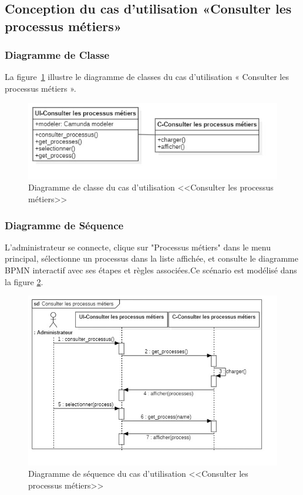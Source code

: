 \subsection{Conception du cas d’utilisation «Consulter les processus métiers»}
\subsubsection{Diagramme de Classe}
La figure~\ref{fig:c_cpmet} illustre le diagramme de classes du cas d'utilisation « Consulter les processus métiers ».
\begin{figure}[h]
     \centering
     \includegraphics[width=14cm]{images/c_cpmet.jpg}
     \caption{Diagramme de classe du cas d'utilisation <<Consulter les processus métiers>>}
     \label{fig:c_cpmet}
\end{figure}
\subsubsection{Diagramme de Séquence}
L'administrateur se connecte, clique sur "Processus métiers" dans le menu principal, sélectionne un processus dans la liste affichée, et consulte le diagramme BPMN interactif avec ses étapes et règles associées.Ce scénario est modélisé dans la figure \ref{fig:S_cpmet}.
\begin{figure}[ht]
    \centering
    \includegraphics[width=13cm, height=0.9\textheight, keepaspectratio]{images/s_cpmet.jpg}
    \caption{Diagramme de séquence du cas d'utilisation <<Consulter les processus métiers>>}
    \label{fig:S_cpmet}
\end{figure}
\newpage
\vspace*{-2cm}
